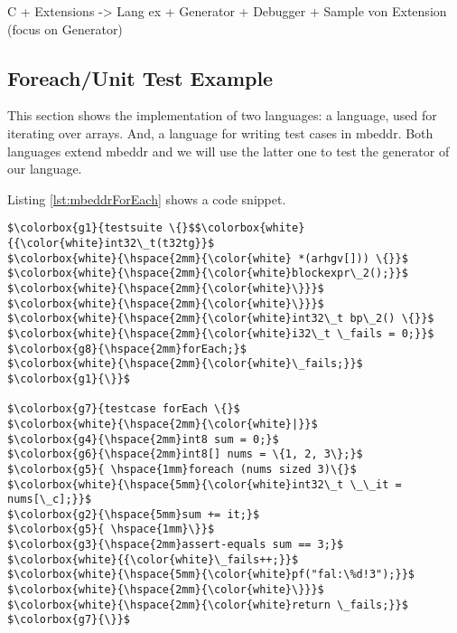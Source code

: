 C + Extensions 
	    -> Lang ex +  Generator + Debugger
		+ Sample von Extension (focus on Generator)
		
\subsection{Foreach/Unit Test Example}

This section shows the implementation of two languages: a  language,
used for iterating over arrays. And, a  language for writing test
cases in mbeddr. Both languages extend mbeddr and we will use the
latter one to test the generator of our  language.

Listing \ref{lst:mbeddrForEach} shows a code snippet.

\noindent 
\begin{minipage}[t]{120pt} 
\begin{lstlisting}[language=mbeddr]
$\colorbox{g1}{testsuite \{}$$\colorbox{white}{{\color{white}int32\_t(t32tg}}$
$\colorbox{white}{\hspace{2mm}{\color{white} *(arhgv[])) \{}}$
$\colorbox{white}{\hspace{2mm}{\color{white}blockexpr\_2();}}$
$\colorbox{white}{\hspace{2mm}{\color{white}\}}}$
$\colorbox{white}{\hspace{2mm}{\color{white}\}}}$
$\colorbox{white}{\hspace{2mm}{\color{white}int32\_t bp\_2() \{}}$ 
$\colorbox{white}{\hspace{2mm}{\color{white}i32\_t \_fails = 0;}}$
$\colorbox{g8}{\hspace{2mm}forEach;}$
$\colorbox{white}{\hspace{2mm}{\color{white}\_fails;}}$
$\colorbox{g1}{\}}$

$\colorbox{g7}{testcase forEach \{}$ 
$\colorbox{white}{\hspace{2mm}{\color{white}|}}$
$\colorbox{g4}{\hspace{2mm}int8 sum = 0;}$
$\colorbox{g6}{\hspace{2mm}int8[] nums = \{1, 2, 3\};}$
$\colorbox{g5}{	\hspace{1mm}foreach (nums sized 3)\{}$
$\colorbox{white}{\hspace{5mm}{\color{white}int32\_t \_\_it = nums[\_c];}}$
$\colorbox{g2}{\hspace{5mm}sum += it;}$
$\colorbox{g5}{	\hspace{1mm}\}}$
$\colorbox{g3}{\hspace{2mm}assert-equals sum == 3;}$
$\colorbox{white}{{\color{white}\_fails++;}}$
$\colorbox{white}{\hspace{5mm}{\color{white}pf("fal:\%d!3");}}$
$\colorbox{white}{\hspace{2mm}{\color{white}\}}}$
$\colorbox{white}{\hspace{2mm}{\color{white}return \_fails;}}$
$\colorbox{g7}{\}}$
\end{lstlisting}
\end{minipage} 
